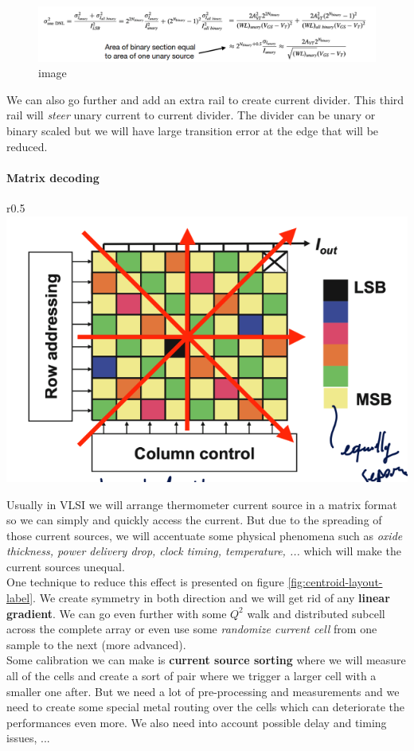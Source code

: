 \documentclass[
  a4paper,
]{article}
\begin{document}
\begin{figure}
\centering
\includegraphics{eq_segme.png}
\caption{image}
\end{figure}

We can also go further and add an extra rail to create current divider.
This third rail will \emph{steer} unary current to current divider. The
divider can be unary or binary scaled but we will have large transition
error at the edge that will be reduced.

\hypertarget{matrix-decoding}{%
\paragraph{Matrix decoding}\label{matrix-decoding}}

r0.5 \includegraphics{img/centroid_layout.png}

Usually in VLSI we will arrange thermometer current source in a matrix
format so we can simply and quickly access the current. But due to the
spreading of those current sources, we will accentuate some physical
phenomena such as \emph{oxide thickness, power delivery drop, clock
timing, temperature, ...} which will make the current sources unequal.\\
One technique to reduce this effect is presented on figure
\protect\hyperlink{fig:centroid-layout-label}{{[}fig:centroid-layout-label{]}}.
We create symmetry in both direction and we will get rid of any
\textbf{linear gradient}. We can go even further with some \(Q^2\) walk
and distributed subcell across the complete array or even use some
\emph{randomize current cell} from one sample to the next (more
advanced).\\
Some calibration we can make is \textbf{current source sorting} where we
will measure all of the cells and create a sort of pair where we trigger
a larger cell with a smaller one after. But we need a lot of
pre-processing and measurements and we need to create some special metal
routing over the cells which can deteriorate the performances even more.
We also need into account possible delay and timing issues, ...
\end{document}
